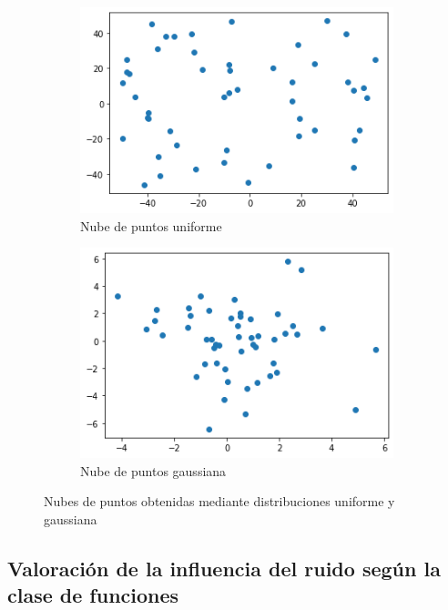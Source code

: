 \documentclass[10pt,a4paper]{article}
\begin{document}
\begin{figure}[h]
	\begin{subfigure}{0.5\textwidth}
		\centering
		\includegraphics[width=\textwidth]{ej1.1_nube_unif}
		\caption{Nube de puntos uniforme}
	\end{subfigure}
	\begin{subfigure}{0.5\textwidth}
		\centering
		\includegraphics[width=\textwidth]{ej1.1_nube_gauss}
		\caption{Nube de puntos gaussiana}
	\end{subfigure}
	\caption{Nubes de puntos obtenidas mediante distribuciones uniforme y gaussiana}
	\label{fig:ej1.1_nubes}
\end{figure}




\subsection{Valoración de la influencia del ruido según la clase de funciones}
\end{document}
